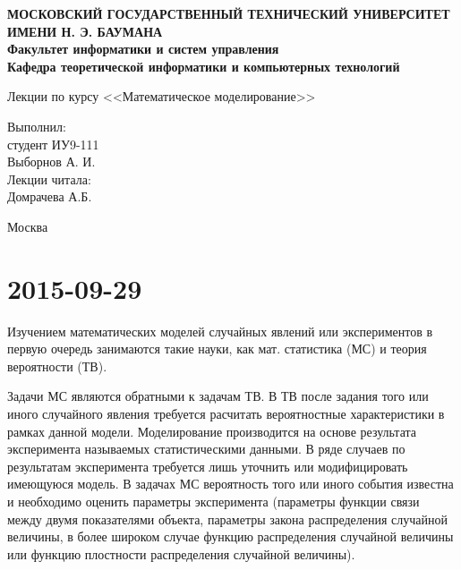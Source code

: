 \documentclass[12pt,a4paper,oneside]{extarticle}
\begin{document}
\pgfplotsset{compat=1.8}

\thispagestyle{empty}
\newpage
{
\centering


\textbf{
МОСКОВСКИЙ ГОСУДАРСТВЕННЫЙ ТЕХНИЧЕСКИЙ УНИВЕРСИТЕТ ИМЕНИ Н. Э. БАУМАНА \\
Факультет информатики и систем управления \\
Кафедра теоретической информатики и компьютерных технологий}
\bigskip
\bigskip
\bigskip
\bigskip
\bigskip
\bigskip
\bigskip

\vfill

\bigskip

{\large Лекции по курсу <<Математическое моделирование>>}
\bigskip

\vfill



\hfill\parbox{4cm} {
Выполнил:\\
студент ИУ9-111 \hfill \\
Выборнов А. И.\hfill \medskip\\
Лекции читала:\\
Домрачева А.Б.\hfill
}


\vspace{\fill}

Москва \number\year
\clearpage
}


\tableofcontents

\clearpage

\section{2015-09-29}

    Изучением математических моделей случайных явлений или экспериментов в первую очередь занимаются такие науки, как мат. статистика (МС) и теория вероятности (ТВ).

    Задачи МС являются обратными к задачам ТВ.
    В ТВ после задания того или иного случайного явления требуется расчитать вероятностные характеристики в рамках данной модели.
    Моделирование производится на основе результата эксперимента называемых статистическими данными.
    В ряде случаев по результатам эксперимента требуется лишь уточнить или модифицировать имеющуюся модель.
    В задачах МС вероятность того или иного события известна и необходимо оценить параметры эксперимента (параметры функции связи между двумя показателями объекта, параметры закона распределения случайной величины, в более широком случае функцию распределения случайной величины или функцию плостности распределения случайной величины).
\end{document}
